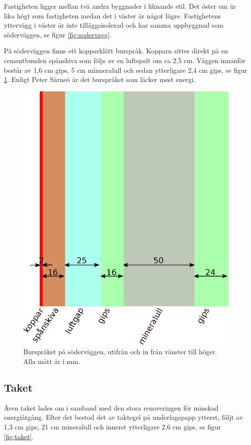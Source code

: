 Fastigheten ligger mellan två andra byggnader i liknande stil. Det öster om är lika högt som fastigheten medan det i väster är något lägre. Fastighetens yttervägg i väster är inte tilläggsisolerad och har samma uppbyggnad som söderväggen, se figur \ref{fig:sodervagg}.

På söderväggen finns ett kopparklätt burspråk. Kopparn sitter direkt på en cementbunden spånskiva som följs av en luftspalt om ca 2,5 cm. Väggen innanför består av 1,6 cm gips, 5 cm minneralull och sedan ytterligare 2,4 cm gips, se figur \ref{fig:bursprak}.\cite{kandidatarbete2010} Enligt Peter Särneö\cite{petersarneo} är det burspråket som läcker mest energi.

\begin{figure}[hpbt]
\centering
\includegraphics[width=0.3\textheight]{images/bursprak.eps}
\caption{\label{fig:bursprak}{Burspråket på söderväggen, utifrån och in från vänster till höger. Alla mått är i mm.}}
\end{figure}

\subsection{Taket}
Även taket lades om i samband med den stora renoveringen för minskad energiåtgång. Efter det bestod det av taktegel på underlagspapp ytterst, följt av 1,3 cm gips, 21 cm mineralull och innerst ytterligare 2,6 cm gips, se figur \ref{fig:taket}.\cite{kandidatarbete2010}

